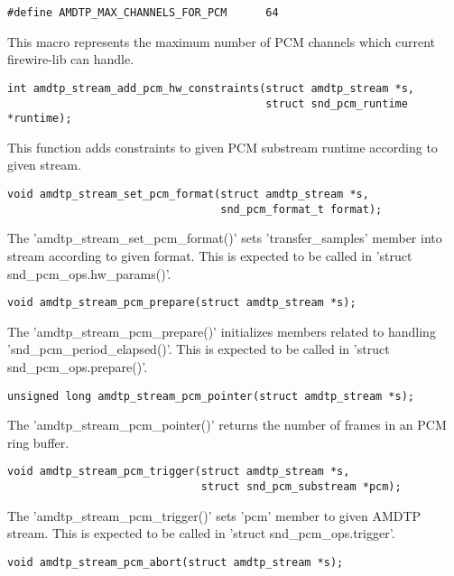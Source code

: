 \documentclass[onecolumn]{article}
\begin{document}
\begin{verbatim}
#define AMDTP_MAX_CHANNELS_FOR_PCM      64
\end{verbatim}

This macro represents the maximum number of PCM channels which current firewire-lib can handle.

\begin{verbatim}
int amdtp_stream_add_pcm_hw_constraints(struct amdtp_stream *s,
                                        struct snd_pcm_runtime *runtime);
\end{verbatim}

This function adds constraints to given PCM substream runtime according to given stream.

\begin{verbatim}
void amdtp_stream_set_pcm_format(struct amdtp_stream *s,
                                 snd_pcm_format_t format);
\end{verbatim}

The 'amdtp\_stream\_set\_pcm\_format()' sets 'transfer\_samples' member into stream according to given format. This is expected to be called in 'struct snd\_pcm\_ops.hw\_params()'.

\begin{verbatim}
void amdtp_stream_pcm_prepare(struct amdtp_stream *s);
\end{verbatim}

The 'amdtp\_stream\_pcm\_prepare()' initializes members related to handling 'snd\_pcm\_period\_elapsed()'. This is expected to be called in 'struct snd\_pcm\_ops.prepare()'.

\begin{verbatim}
unsigned long amdtp_stream_pcm_pointer(struct amdtp_stream *s);
\end{verbatim}

The 'amdtp\_stream\_pcm\_pointer()' returns the number of frames in an PCM ring buffer.

\begin{verbatim}
void amdtp_stream_pcm_trigger(struct amdtp_stream *s,
                              struct snd_pcm_substream *pcm);
\end{verbatim}

The 'amdtp\_stream\_pcm\_trigger()' sets 'pcm' member to given AMDTP stream. This is expected to be called in 'struct snd\_pcm\_ops.trigger'.

\begin{verbatim}
void amdtp_stream_pcm_abort(struct amdtp_stream *s);
\end{verbatim}
\end{document}
